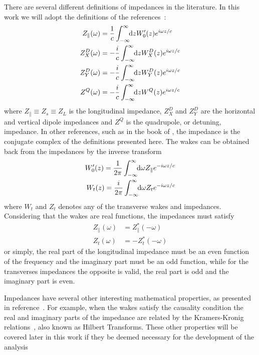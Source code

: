     There are several different definitions of impedances in the literature. In this work we will adopt the definitions of the references~\cite{Chao1993, Stupakov2000a, Heifets1991}:
    \begin{align}\label{eq:impedances_definition}
	  	\nonumber
  	  	Z_\parallel(\omega) &= \frac1c \infint{z}{W'_0(z)e^{i\omega z/c}}\\
  	  	\nonumber
      	Z^D_X(\omega) &= -\frac{i}{c} \infint{z}{W^D_X(z)e^{i\omega z/c}}\\
      	Z^D_Y(\omega) &= -\frac{i}{c} \infint{z}{W^D_Y(z)e^{i\omega z/c}}\\
	  	\nonumber
      	Z^Q(\omega) &= -\frac{i}{c} \infint{z}{W^Q(z)e^{i\omega z/c}}
    \end{align}
    where $Z_\parallel \equiv Z_s \equiv Z_L$ is the longitudinal impedance, $Z^D_X$ and $Z^D_Y$ are the horizontal and vertical dipole impedances and $Z^Q$ is the quadrupole, or detuning, impedance. In other references, such as in the book of , the impedance is the conjugate complex of the definitions presented here. The wakes can be obtained back from the impedances by the inverse transform
    \begin{align}\label{eq:wake_as_impedance}
	  	\nonumber
  	  	W'_0(z) = \frac{1}{2\pi}\int_{-\infty}^{\infty}\!\!\text{d}\omega Z_\parallel e^{-i\omega z/c}\\
	  	W_t(z) = \frac{i}{2\pi}\int_{-\infty}^{\infty}\!\!\text{d}\omega Z_t e^{-i\omega z/c}
    \end{align}
    where $W_t$ and $Z_t$ denotes any of the transverse wakes and impedances. Considering that the wakes are real functions, the impedances must satisfy
    \begin{subequations}\label{eq:impedance_even_odd}
    \begin{align}\label{eq:impedance_even_odd_long}
  	  	Z_\parallel(\omega) &= Z_\parallel^*(-\omega)\\\label{eq:impedance_even_odd_trans}
	  	Z_t(\omega) &= -Z_t^*(-\omega)
    \end{align}
    \end{subequations}
    or simply, the real part of the longitudinal impedance must be an even function of the frequency and the imaginary part must be an odd function, while for the transverses impedances the opposite is valid, the real part is odd and the imaginary part is even.

    Impedances have several other interesting mathematical properties, as presented in reference~\cite{Chao1993}. For example, when the wakes satisfy the causality condition the real and imaginary parts of the impedance are related by the Kramers-Kronig relations~\cite{Kronig1926}, also known as Hilbert Transforms. These other properties will be covered later in this work if they be deemed necessary for the development of the analysis

